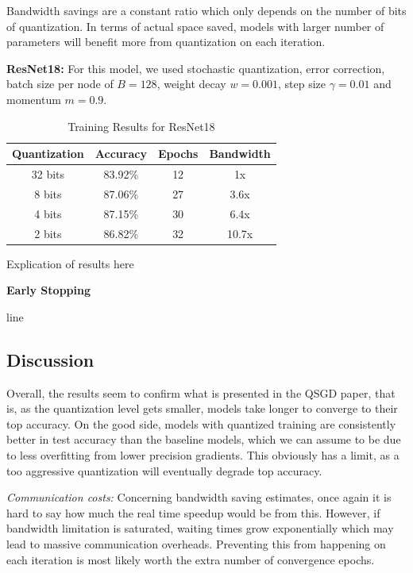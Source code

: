 \documentclass[10pt,conference,compsocconf]{IEEEtran}
\begin{document}
\vspace{-1.5em}
Bandwidth savings are a constant ratio which only depends on the number of bits of quantization. In terms of actual space saved, models with larger number of parameters will benefit more from quantization on each iteration.
\vspace{0.3em}

\textbf{ResNet18:} For this model, we used stochastic quantization, error correction, batch size per node of $B = 128$, weight decay $w = 0.001$, step size $\gamma = 0.01$ and momentum $m = 0.9$.

\begin{table}[htbp]
  \centering
  \begin{tabular}[c]{|c||c|c|c|}
    \hline
	  Quantization&Accuracy&Epochs&Bandwidth\\
    \hline
	  32 bits&83.92\% &12&1x\\
	  8 bits&87.06\%&27&3.6x\\
	  4 bits&87.15\%&30&6.4x\\
	  2 bits&86.82\%&32&10.7x\\
    \hline
  \end{tabular}
	\vspace{0.7em}
	\caption{Training Results for ResNet18}
\end{table}
\vspace{-1.5em}


Explication of results here 

\textbf{Early Stopping}

line
\vspace{0.3em}


\subsection{Discussion}


Overall, the results seem to confirm what is presented in the QSGD paper, that is, as the quantization level gets smaller, models take longer to converge to their top accuracy. On the good side, models with quantized training are consistently better in test accuracy than the baseline models, which we can assume to be due to less overfitting from lower precision gradients. This obviously has a limit, as a too aggressive quantization will eventually degrade top accuracy.

\textit{Communication costs:} Concerning bandwidth saving estimates, once again it is hard to say how much the real time speedup would be from this. However, if bandwidth limitation is saturated, waiting times grow exponentially which may lead to massive communication overheads. Preventing this from happening on each iteration is most likely worth the extra number of convergence epochs. 
\end{document}

